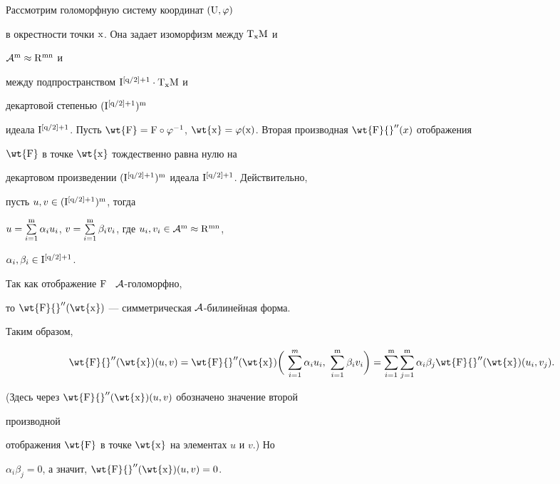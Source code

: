  


\begin{pf} 


Рассмотрим голоморфную систему координат $(\mathrm U,\varphi)$ 


в окрестности точки $\mathrm x$. Она задает изоморфизм между $\mathrm T_{\mathrm x}\mathrm M$ и 


$\cal A^{\mathrm m}\approx\mathrm R^{\mathrm {mn}}$ и 


между подпространством $\mathrm I^{[\mathrm q/2]+1}\cdot\mathrm T_{\mathrm x}\mathrm M$ и 


декартовой степенью $(\mathrm I^{[\mathrm q/2]+1})^{\mathrm m}$ 


идеала $\M I^{[\M q/2]+1}$. Пусть $\wt{\M F}=\M F\circ\varphi^{-1}$, $\wt{\M 


x}=\varphi(\M x)$. Вторая производная $\wt{\M F}{}''(x)$ отображения 


$\wt{\M F}$ в точке $\wt{\M x}$ тождественно равна нулю на 


декартовом произведении $(\M I^{[\M q/2]+1})^{\M m}$ идеала $\M I^{[\M 


q/2]+1}$. Действительно, 


пусть $u,v\in(\mathrm I^{[\mathrm q/2]+1})^{\mathrm m}$, тогда 


$u=\sum\limits^{\M m}_{i=1}\alpha_i u_i$, $v=\sum\limits^{\M 


m}_{i=1}\beta_i v_i$, где $u_i,v_i\in\cal A^{\M m}\approx\M R^{\M {mn}}$, 


$\alpha_i,\beta_i\in\mathrm I^{[\mathrm q/2]+1}$. 


Так как отображение $\mathrm F$ \ $\cal A$-голоморфно,


то $\wt{\M F}{}''(\wt{\M x})$ --- симметрическая $\cal A$-билинейная форма.


Таким образом, 


$$ 


\wt{\M F}{}''(\wt{\M x})(u,v)=\wt{\M F}{}''(\wt{\M x})\bigg(\, 


\sum^m_{i=1}\alpha_i u_i,\


\sum^{\M m}_{i=1}\beta_i v_i\bigg)=\sum^{\M m}_{i=1} 


\sum^{\M m}_{j=1}\alpha_i\beta_j 


\wt{\M F}{}''(\wt{\M x})(u_i,v_j). 


$$ 


(Здесь через $\wt {\M F}{}''(\wt{\M x})(u,v)$ обозначено значение второй 


производной 


отображения $\wt{\M F}$ в точке $\wt{\M x}$ на элементах $u$ и $v$.) Но 


$\alpha_i\beta_j=0$, а значит, $\wt{\M F}{}''(\wt{\M x})(u,v)=0$. 


\end{pf} 


